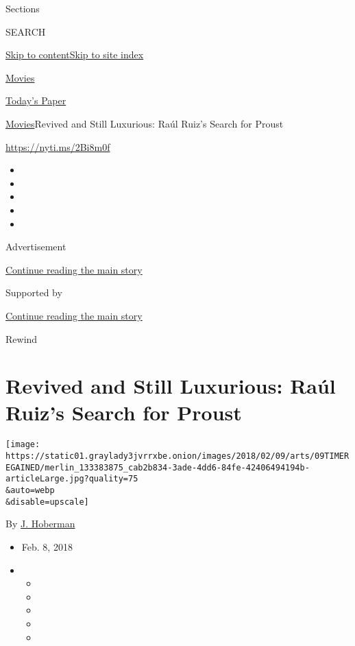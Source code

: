Sections

SEARCH

\protect\hyperlink{site-content}{Skip to
content}\protect\hyperlink{site-index}{Skip to site index}

\href{https://www.nytimes3xbfgragh.onion/section/movies}{Movies}

\href{https://myaccount.nytimes3xbfgragh.onion/auth/login?response_type=cookie\&client_id=vi}{}

\href{https://www.nytimes3xbfgragh.onion/section/todayspaper}{Today's
Paper}

\href{/section/movies}{Movies}\textbar{}Revived and Still Luxurious:
Raúl Ruiz's Search for Proust

\url{https://nyti.ms/2Bi8m0f}

\begin{itemize}
\item
\item
\item
\item
\item
\end{itemize}

Advertisement

\protect\hyperlink{after-top}{Continue reading the main story}

Supported by

\protect\hyperlink{after-sponsor}{Continue reading the main story}

Rewind

\hypertarget{revived-and-still-luxurious-rauxfal-ruizs-search-for-proust}{%
\section{Revived and Still Luxurious: Raúl Ruiz's Search for
Proust}\label{revived-and-still-luxurious-rauxfal-ruizs-search-for-proust}}

\texttt{[image: https://static01.graylady3jvrrxbe.onion/images/2018/02/09/arts/09TIMEREGAINED/merlin\_133383875\_cab2b834-3ade-4dd6-84fe-42406494194b-articleLarge.jpg?quality=75\\\&auto=webp\\\&disable=upscale]}

By \href{https://www.nytimes3xbfgragh.onion/by/j-hoberman}{J. Hoberman}

\begin{itemize}
\item
  Feb. 8, 2018
\item
  \begin{itemize}
  \item
  \item
  \item
  \item
  \item
  \end{itemize}
\end{itemize}

